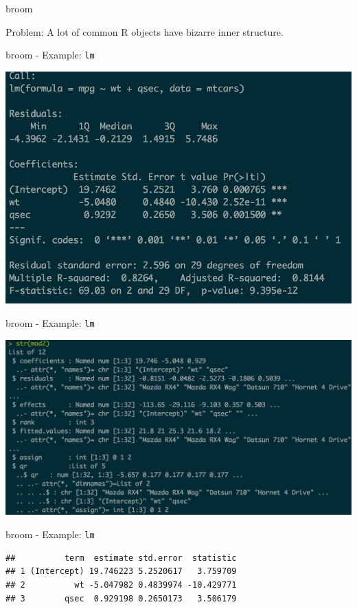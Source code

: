 \begin{frame}{broom}

Problem: A lot of common R objects have bizarre inner structure.

\end{frame}

\begin{frame}{broom - Example: \texttt{lm}}

\includegraphics{images/broom1.png}

\end{frame}

\begin{frame}{broom - Example: \texttt{lm}}

\includegraphics{images/broom2.png}

\end{frame}

\begin{frame}[fragile]{broom - Example: \texttt{lm}}

\begin{Shaded}
\begin{Highlighting}[]
\NormalTok{(mod2)[,}\NormalTok{:}\NormalTok{]}
\end{Highlighting}
\end{Shaded}

\begin{verbatim}
##          term  estimate std.error  statistic
## 1 (Intercept) 19.746223 5.2520617   3.759709
## 2          wt -5.047982 0.4839974 -10.429771
## 3        qsec  0.929198 0.2650173   3.506179
\end{verbatim}

\end{frame}

